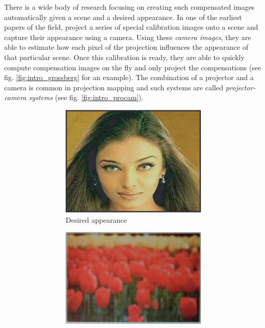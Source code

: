 There is a wide body of research focusing on creating such compensated images automatically given a scene and a desired appearance. In one of the earliest papers of the field, \citet{Grossberg2004} project a series of special calibration images onto a scene and capture their appearance using a camera. Using these \textit{camera images}, they are able to estimate how each pixel of the projection influences the appearance of that particular scene. Once this calibration is ready, they are able to quickly compute compensation images on the fly and only project the compensations (see fig. \ref{fig:intro_grossberg} for an example). The combination of a projector and a camera is common in projection mapping and such systems are called \textit{projector-camera systems} (see fig. \ref{fig:intro_procam}).

\begin{figure}[ht]
    \centering    
    \begin{subfigure}{0.8\textwidth}
        \centering
        \begin{subfigure}{0.3\textwidth}
            \centering
            \includegraphics[width=\textwidth]{images/01-desired_appearance.png}
            \caption{Desired appearance}
            \label{fig:intro_grossberg-desired_appearance}
        \end{subfigure}
        \hfill
        \begin{subfigure}{0.3\textwidth}
            \centering
            \includegraphics[width=\textwidth]{images/01-background.png}

\end{subfigure}
\end{subfigure}
\end{figure}
